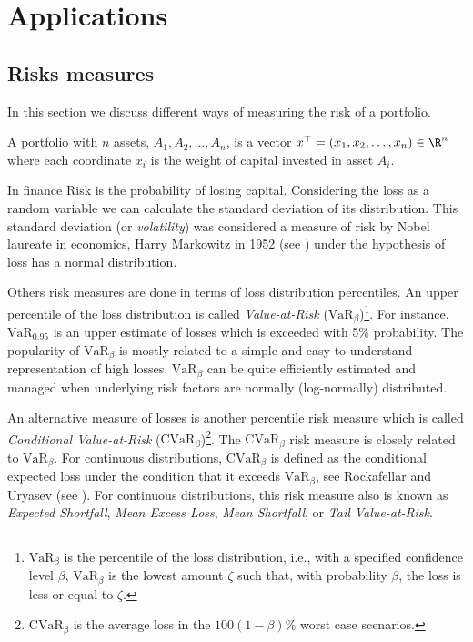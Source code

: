 \chapter{Applications} \label{chap:App}

\section{Risks measures}

In this section we discuss different ways of measuring the risk of a portfolio.
\begin{definition}
	A portfolio with $n$ assets, $A_1, A_2, \dots, A_n$, is a vector $x^\top = (x_1, x_2, \dots, x_n)\in \R^n$ where each coordinate $x_i$ is the weight of capital invested in asset $A_i$.
\end{definition}
In finance Risk is the probability of losing capital. Considering the loss as a random variable we can calculate the standard deviation of its distribution. This standard deviation (or \textit{volatility}) was considered a measure of risk by Nobel laureate in economics, Harry Markowitz in 1952 (see \cite{Markowitz1952}) under the hypothesis of loss has a normal distribution.

Others risk measures are done in terms of loss distribution percentiles. An upper percentile of the loss distribution is called \textit{Value-at-Risk} ($\mbox{VaR}_\beta$)\footnote{$\mbox{VaR}_\beta$ is the percentile of the loss distribution, i.e., with a specified confidence level $\beta$,  $\mbox{VaR}_\beta$ is the lowest amount $\zeta$ such that, with probability $\beta$, the loss is less or equal to $\zeta$.}. For instance, $\mbox{VaR}_{0.95}$ is an upper estimate of losses which is exceeded with 5\% probability. The popularity of $\mbox{VaR}_\beta$ is mostly related to a simple and easy to understand representation of high losses. $\mbox{VaR}_\beta$ can be quite efficiently estimated and managed when underlying risk factors are normally (log-normally) distributed.

An alternative measure of losses is another percentile risk measure which is called \textit{Conditional Value-at-Risk} ($\mbox{CVaR}_\beta$)\footnote{$\mbox{CVaR}_\beta$ is the average loss in the $100(1-\beta)$\% worst case scenarios.}. The $\mbox{CVaR}_\beta$ risk measure is closely related to $\mbox{VaR}_\beta$. For continuous distributions, $\mbox{CVaR}_\beta$ is defined as the conditional expected loss under the condition that it exceeds $\mbox{VaR}_\beta$, see Rockafellar and Uryasev (see \cite{RockafellarUryasev2001}). For continuous distributions, this risk measure also is known as \emph{Expected Shortfall}, \textit{Mean Excess Loss}, \textit{Mean Shortfall}, or \textit{Tail Value-at-Risk}.


